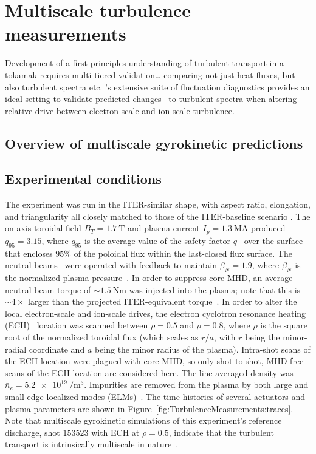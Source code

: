 \chapter{Multiscale turbulence measurements}
\label{ch:TurbulenceMeasurements}
Development of a first-principles understanding
of turbulent transport in a tokamak
requires multi-tiered validation\ldots
comparing not just heat fluxes, but
also turbulent spectra etc.
\diiid's extensive suite of fluctuation diagnostics
provides an ideal setting to validate
predicted changes~\cite{howard_pp16}
to turbulent spectra when altering relative drive
between electron-scale and ion-scale turbulence.


\section{Overview of multiscale gyrokinetic predictions}


\section{Experimental conditions}
The experiment was run in the ITER-similar shape,
with aspect ratio, elongation, and triangularity
all closely matched to those of the ITER-baseline scenario
\cite[Sec.~13.5 \& 13.6]{wesson}.
The on-axis toroidal field $B_T = \SI{1.7}{\tesla}$ and
plasma current $I_p = \SI{1.3}{\mega\ampere}$
produced $q_{95} = 3.15$,
where $q_{95}$ is the average value
of the safety factor $q$~\cite[Sec.~3.4]{wesson}
over the surface that encloses $95\%$
of the poloidal flux within the last-closed flux surface.
The neutral beams~\cite[Sec.~5.3-5.5]{wesson}
were operated with feedback to maintain
$\beta_N = 1.9$, where
$\beta_N$ is the normalized plasma pressure~\cite[Sec.~6.18]{wesson}.
In order to suppress core MHD,
an average neutral-beam torque of $\sim \SI{1.5}{\newton \meter}$
was injected into the plasma;
note that this is $\sim 4\times$ larger than
the projected ITER-equivalent torque~\cite{garofalo_nf11}.
In order to alter the local electron-scale and ion-scale drives,
the electron cyclotron resonance heating (ECH)~\cite[Sec.~5.10]{wesson}
location was scanned between $\rho = 0.5$ and $\rho = 0.8$,
where $\rho$ is the square root of the normalized toroidal flux
(which scales as $r / a$, with
$r$ being the minor-radial coordinate and
$a$ being the minor radius of the plasma).
Intra-shot scans of the ECH location
were plagued with core MHD, so
only shot-to-shot, MHD-free scans of the ECH location
are considered here.
The line-averaged density was
$\bar{n}_e = \SI{5.2e19}{\per\meter\cubed}$.
Impurities are removed from the plasma
by both large and small edge localized modes (ELMs)~\cite[Sec.~7.17]{wesson}.
The time histories of several actuators and plasma parameters
are shown in Figure~\ref{fig:TurbulenceMeasurements:traces}.
Note that multiscale gyrokinetic simulations
of this experiment's reference discharge,
\diiid\space shot $153523$ with ECH at $\rho = 0.5$,
indicate that the turbulent transport
is intrinsically multiscale in nature~\cite{holland_nf17}.

